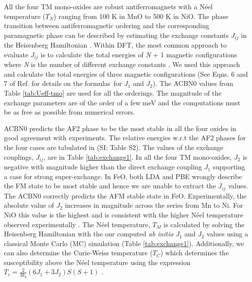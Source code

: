 \documentclass[12pt,a4paper,final]{iopart}
\begin{document}
\bigskip
All the four TM mono-oxides are robust antiferromagnets with a N\'eel temperature ($T_N$) ranging from 100 K in MnO to 500 K in NiO. The phase transition between antiferromagnetic ordering and the corresponding paramagnetic phase can be described by estimating the exchange constants $J_{ij}$ in the Heisenberg Hamiltonian \cite{fischer2009exchange,gopal2004first}. Within DFT, the most common approach to evaluate $J_{ij}$ is to calculate the total energies of \textit{N} + 1 magnetic configurations where \textit{N} is the number of different exchange constants \cite{fischer2009exchange,archer2011exchange}.
We used this approach and calculate the total energies of three magnetic configurations (See Eqns. 6 and 7 of Ref. \cite{fischer2009exchange} for details on the formulas\ for $J_1$ and $J_2$). The ACBN0 values from Table \ref{tab:Ueff-tmo} are used for all the orderings. The magnitude of the exchange parameters are of the order of a few meV and the computations must be as free as possible from numerical errors. 

ACBN0 predicts the AF2 phase to be the most stable in all the four oxides in good agreement with experiments. The relative energies w.r.t the AF2 phases for the four cases are tabulated in (SI: Table S2). The values of the exchange couplings, $J_{ij}$, are in Table \ref{tab:exchange1}. In all the four TM mono-oxides, $J_2$  is negative with magnitude higher than the direct exchange coupling $J_1$ supporting a case for strong super-exchange. In FeO, both LDA and PBE wrongly describe the FM state to be most stable and hence we are unable to extract the $J_{ij}$ values. The ACBN0 correctly predicts the AFM stable state in FeO. Experimentally, the absolute value of $J_2$ increases in magnitude across the series from Mn to Ni. For NiO this value is the highest and is consistent with the higher N\'eel temperature observed experimentally \cite{potapkin2016magnetic}. 
The N\'eel temperature, $T_M$ is calculated by solving the Heisenberg Hamiltonian with the our computed \textit{ab initio} $J_1$ and $J_2$ values using a classical Monte Carlo (MC) simulation (Table \ref{tab:exchange1}). Additionally, we can also determine the Curie-Weiss temperature ($T_C$) which determines the susceptibility above the N\'eel temperature using  the expression $T_c = \frac{2}{3k_b}(6J_1+3J_2)S(S+1)$ \cite{harrison2007heisenberg}.
\end{document}
